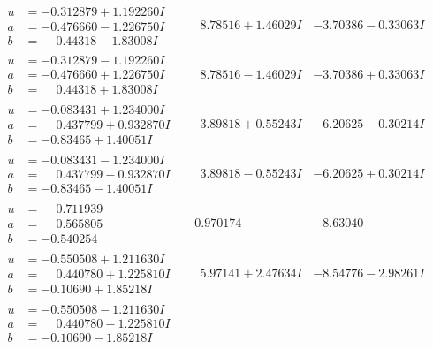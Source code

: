 \documentclass[1p]{elsarticle_modified}
\theoremstyle{definition}
\begin{document}
$$\begin{array}{c|c|c}
\begin{aligned}
u &= -0.312879 + 1.192260 I \\
a &= -0.476660 - 1.226750 I \\
b &= \phantom{-}0.44318 - 1.83008 I\end{aligned}
 & \phantom{-}8.78516 + 1.46029 I & -3.70386 - 0.33063 I \\ \hline\begin{aligned}
u &= -0.312879 - 1.192260 I \\
a &= -0.476660 + 1.226750 I \\
b &= \phantom{-}0.44318 + 1.83008 I\end{aligned}
 & \phantom{-}8.78516 - 1.46029 I & -3.70386 + 0.33063 I \\ \hline\begin{aligned}
u &= -0.083431 + 1.234000 I \\
a &= \phantom{-}0.437799 + 0.932870 I \\
b &= -0.83465 + 1.40051 I\end{aligned}
 & \phantom{-}3.89818 + 0.55243 I & -6.20625 - 0.30214 I \\ \hline\begin{aligned}
u &= -0.083431 - 1.234000 I \\
a &= \phantom{-}0.437799 - 0.932870 I \\
b &= -0.83465 - 1.40051 I\end{aligned}
 & \phantom{-}3.89818 - 0.55243 I & -6.20625 + 0.30214 I \\ \hline\begin{aligned}
u &= \phantom{-}0.711939\phantom{ +0.000000I} \\
a &= \phantom{-}0.565805\phantom{ +0.000000I} \\
b &= -0.540254\phantom{ +0.000000I}\end{aligned}
 & -0.970174\phantom{ +0.000000I} & -8.63040\phantom{ +0.000000I} \\ \hline\begin{aligned}
u &= -0.550508 + 1.211630 I \\
a &= \phantom{-}0.440780 + 1.225810 I \\
b &= -0.10690 + 1.85218 I\end{aligned}
 & \phantom{-}5.97141 + 2.47634 I & -8.54776 - 2.98261 I \\ \hline\begin{aligned}
u &= -0.550508 - 1.211630 I \\
a &= \phantom{-}0.440780 - 1.225810 I \\
b &= -0.10690 - 1.85218 I\end{aligned}

\end{array}$$
\end{document}

